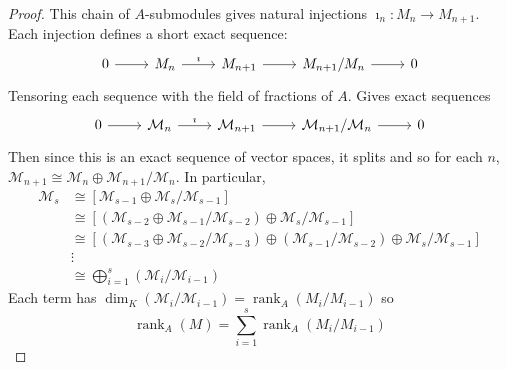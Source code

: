 \documentclass[hidelinks,12pt]{article}
\newcommand{\rk}{\operatorname{rank}}
\begin{document}
\begin{enumerate}
\begin{proof}
       This chain of \(A\)-submodules gives natural injections \(\imath_{n}:M_n\to M_{n+1}\). Each injection defines a short exact sequence:
       \[
           \begin{tikzcd}
               0\arrow[r] & M_{n}\arrow[r, "\imath"] & M_{n+1}\arrow[r] & M_{n+1}/M_n\arrow[r]& 0
   \end{tikzcd}
       \]
       Tensoring each sequence with the field of fractions of \(A\). Gives exact sequences
\[
           \begin{tikzcd}
               0\arrow[r] & \mathcal{M}_{n}\arrow[r, "\imath"] & \mathcal{M}_{n+1}\arrow[r] & \mathcal{M}_{n+1}/\mathcal{M}_n\arrow[r]& 0
   \end{tikzcd}
       \]
       Then since this is an exact sequence of vector spaces, it splits and so for each \(n\), \(\mathcal{M}_{n+1}\cong\mathcal{M}_{n}\oplus\mathcal{M}_{n+1}/\mathcal{M}_{n}\). In particular,
       \begin{align*}
           \mathcal{M}_{s}&\cong\left[\mathcal{M}_{s-1}\oplus\mathcal{M}_{s}/\mathcal{M}_{s-1}\right]\\
           &\cong\left[\left(\mathcal{M}_{s-2}\oplus\mathcal{M}_{s-1}/\mathcal{M}_{s-2}\right)\oplus\mathcal{M}_{s}/\mathcal{M}_{s-1}\right]\\
           &\cong\left[\left(\mathcal{M}_{s-3}\oplus\mathcal{M}_{s-2}/\mathcal{M}_{s-3}\right)\oplus\left(\mathcal{M}_{s-1}/\mathcal{M}_{s-2}\right)\oplus\mathcal{M}_{s}/\mathcal{M}_{s-1}\right]\\
           &\vdots\\
           &\cong\bigoplus_{i=1}^{s}(\mathcal{M}_{i}/\mathcal{M}_{i-1})
       \end{align*}
       Each term has \(\dim_K(\mathcal{M}_i/\mathcal{M}_{i-1})=\rk_A(M_i/M_{i-1})\) so \[\rk_A(M)=\sum_{i=1}^s\rk_A(M_i/M_{i-1})\]
\end{proof} 
\end{enumerate}
\end{document}
